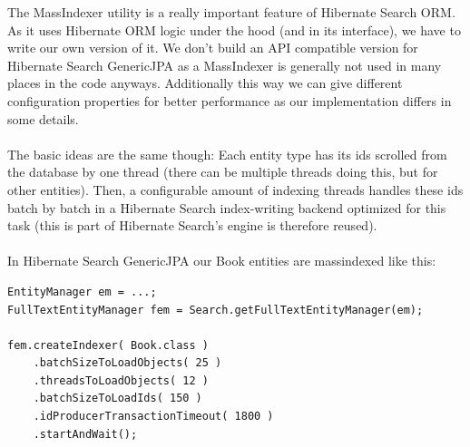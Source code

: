 The MassIndexer utility is a really important feature of Hibernate Search ORM. As it uses Hibernate ORM logic under the hood (and in its interface), we have to write our own version of it. We don't build an API compatible version for Hibernate Search GenericJPA as a MassIndexer is generally not used in many places in the code anyways. Additionally this way we can give different configuration properties for better performance as our implementation differs in some details.
\\\\
The basic ideas are the same though: Each entity type has its ids scrolled from the database by one thread (there can be multiple threads doing this, but for other entities). Then, a configurable amount of indexing threads handles these ids batch by batch in a Hibernate Search index-writing backend optimized for this task (this is part of Hibernate Search's engine is therefore reused).
\\\\
In Hibernate Search GenericJPA our Book entities are massindexed like this:
\\
\lstset{language=java}
\begin{lstlisting}[frame=htrbl, caption={MassIndexer usage with Hibernate Search ORM}, label={lst:massindexing_hsearch_orm.java}]
EntityManager em = ...;
FullTextEntityManager fem = Search.getFullTextEntityManager(em);

fem.createIndexer( Book.class )
	.batchSizeToLoadObjects( 25 )
	.threadsToLoadObjects( 12 )
	.batchSizeToLoadIds( 150 )
	.idProducerTransactionTimeout( 1800 )
	.startAndWait();
\end{lstlisting}

\pagebreak